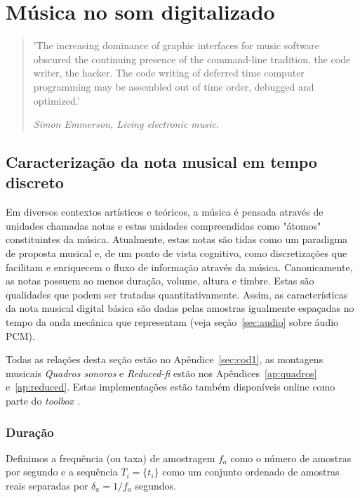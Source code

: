 \chapter{Música no som digitalizado} %
\label{cap:resultados} %
\begin{quotation}
\small
'The increasing dominance of graphic interfaces for music software obscured 
the continuing presence of the command-line tradition, 
the code writer, the hacker. The code writing of deferred time 
computer programming may be assembled out of time order, debugged and optimized.'

\emph{Simon Emmerson, Living electronic music.\cite{Emmerson}}
\end{quotation}


\section{Caracterização da nota musical em tempo discreto}\label{sec:notaDisc}
Em diversos contextos artísticos e teóricos, 
a música é pensada através de 
unidades chamadas notas e 
estas unidades compreendidas como "átomos" constituintes da música.\cite{Wisnick, Lovelock, Webern}
Atualmente, estas notas
são tidas como um paradigma de proposta musical
e, de um ponto de vista cognitivo, como discretizações
que facilitam e enriquecem o fluxo de informação através da música.\cite{Roederer, Lacerda}
Canonicamente, as notas possuem ao menos duração, volume, altura e timbre.\cite{Lacerda} Estas
são qualidades que podem ser tratadas quantitativamente.\cite{Roederer}
Assim, as características da nota musical digital básica são dadas pelas amostras igualmente espaçadas no tempo
da onda mecânica que representam (veja seção~\ref{sec:audio} sobre áudio PCM).

Todas as relações desta seção estão no Apêndice~\ref{sec:cod1}, as montagens musicais \emph{Quadros sonoros} e \emph{Reduced-fi} estão nos Apêndices~\ref{ap:quadros} e~\ref{ap:reduced}. Estas implementações estão também disponíveis online como parte do \emph{toolbox} \massa.\cite{MASSA}

\subsection{Duração}
 Definimos a
frequência (ou taxa) de amostragem $f_a$ como o número de amostras por segundo e
a sequência $T_i=\{t_i\}$ como um conjunto ordenado de amostras reais separadas por $\delta_a=1/f_a$ segundos.

